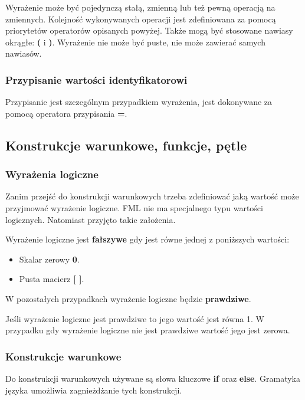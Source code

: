 \documentclass[12pt,a4paper]{article}
\begin{document}
Wyrażenie może być pojedynczą stałą, zmienną lub też pewną operacją na zmiennych. Kolejność wykonywanych operacji jest zdefiniowana za pomocą priorytetów operatorów opisanych powyżej. Także mogą być stosowane nawiasy okrągłe: \textbf{(} i \textbf{)}. Wyrażenie nie może być puste, nie może zawierać samych nawiasów.

\subsubsection{Przypisanie wartości identyfikatorowi}

Przypisanie jest szczególnym przypadkiem wyrażenia, jest dokonywane za pomocą operatora przypisania \textbf{=}. 

\subsection{Konstrukcje warunkowe, funkcje, pętle}

\subsubsection{Wyrażenia logiczne}

Zanim przejść do konstrukcji warunkowych trzeba zdefiniować jaką wartość może przyjmować wyrażenie logiczne. FML nie ma specjalnego typu wartości logicznych. Natomiast przyjęto takie założenia.

Wyrażenie logiczne jest \textbf{fałszywe} gdy jest równe jednej z poniższych wartości:

\begin{itemize}
  \item Skalar zerowy \textbf{0}.
  \item Pusta macierz \textbf{[ ]}.
\end{itemize}

W pozostałych przypadkach wyrażenie logiczne będzie \textbf{prawdziwe}.

Jeśli wyrażenie logiczne jest prawdziwe to jego wartość jest równa 1. W przypadku gdy wyrażenie logiczne nie jest prawdziwe wartość jego jest zerowa.

\subsubsection{Konstrukcje warunkowe}

Do konstrukcji warunkowych używane są słowa kluczowe \textbf{if} oraz \textbf{else}. Gramatyka języka umożliwia zagnieżdżanie tych konstrukcji.
\end{document}
